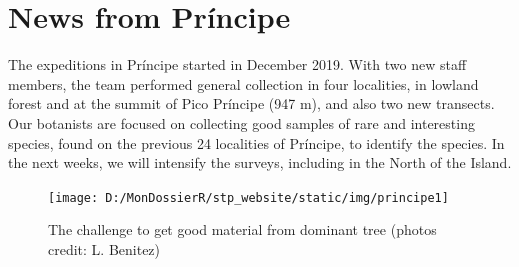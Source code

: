 \documentclass[
]{article}
\begin{document}
\hypertarget{news-from-pruxedncipe}{%
\section{News from Príncipe}\label{news-from-pruxedncipe}}

The expeditions in Príncipe started in December 2019. With two new staff members, the team performed general collection in four localities, in lowland forest and at the summit of Pico Príncipe (947 m), and also two new transects. Our botanists are focused on collecting good samples of rare and interesting species, found on the previous 24 localities of Príncipe, to identify the species. In the next weeks, we will intensify the surveys, including in the North of the Island.

\begin{figure}
\texttt{[image: D:/MonDossierR/stp\_website/static/img/principe1]} \caption{The challenge to get good material from dominant tree (photos credit: L. Benitez)}\label{fig:unnamed-chunk-4}
\end{figure}
\end{document}
